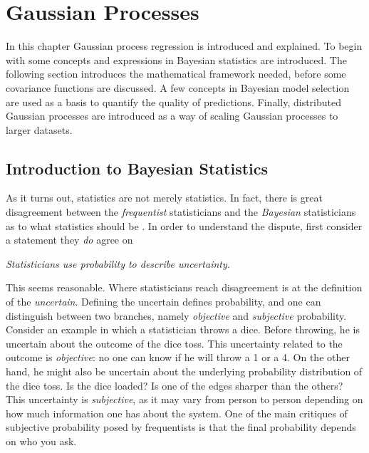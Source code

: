 \documentclass[twoside,english]{uiofysmaster}
\begin{document}
\tableofcontents



\chapter{Gaussian Processes}

In this chapter Gaussian process regression is introduced and explained. To begin with some concepts and expressions in Bayesian statistics are introduced. The following section introduces the mathematical framework needed, before some covariance functions are discussed. A few concepts in Bayesian model selection are used as a basis to quantify the quality of predictions. Finally, distributed Gaussian processes are introduced as a way of scaling Gaussian processes to larger datasets.

\section{Introduction to Bayesian Statistics}

As it turns out, statistics are not merely statistics. In fact, there is great disagreement between the \textit{frequentist} statisticians and the \textit{Bayesian} statisticians as to what statistics should be . In order to understand the dispute, first consider a statement they \textit{do} agree on

\begin{center}
\textit{Statisticians use probability to describe uncertainty.}
\end{center}

This seems reasonable. Where statisticians reach disagreement is at the definition of the \textit{uncertain}. Defining the uncertain defines probability, and one can distinguish between two branches, namely \textit{objective} and \textit{subjective} probability. Consider an example in which a statistician throws a dice. Before throwing, he is uncertain about the outcome of the dice toss. This uncertainty related to the outcome is \textit{objective}: no one can know if he will throw a 1 or a 4. On the other hand, he might also be uncertain about the underlying probability distribution of the dice toss. Is the dice loaded? Is one of the edges sharper than the others? This uncertainty is \textit{subjective}, as it may vary from person to person depending on how much information one has about the system. One of the main critiques of subjective probability posed by frequentists is that the final probability depends on who you ask.
\end{document}
